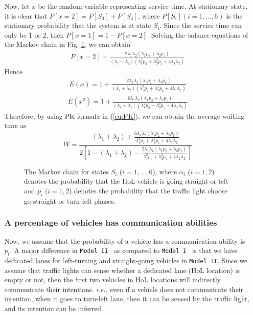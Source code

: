 \documentclass[conference]{IEEEtran}
\newcommand{\ie}{{\em i.e., }}
\newcommand{\modelI}{{\tt{Model I}}}
\newcommand{\modelII}{{\tt{Model II}}}
\begin{document}
Now, let $x$ be the random variable representing service time. At stationary state, it is clear that $P[x=2]=P[S_3]+P[S_4]$, where $P[S_i](i=1,\ldots,6)$ is the stationary probability that the system is at state $S_i$. Since the service time can only be 1 or 2, then $P[x=1]=1-P[x=2]$. Solving the balance equations of the Markov chain in Fig. \ref{fig:markov}, we can obtain
\begin{eqnarray}
P[x=2] = \frac{2\lambda_1\lambda_2(\lambda_1p_2+\lambda_2p_1)}{(\lambda_1+\lambda_2)(\lambda_1^2p_2+\lambda_2^2p_1+4\lambda_1\lambda_2)}
\end{eqnarray}
Hence
\begin{eqnarray}
E(x) = 1+\frac{2\lambda_1\lambda_2(\lambda_1p_2+\lambda_2p_1)}{(\lambda_1+\lambda_2)(\lambda_1^2p_2+\lambda_2^2p_1+4\lambda_1\lambda_2)}
\end{eqnarray}
\begin{eqnarray}
E(x^2) =  1+\frac{6\lambda_1\lambda_2(\lambda_1p_2+\lambda_2p_1)}{(\lambda_1+\lambda_2)(\lambda_1^2p_2+\lambda_2^2p_1+4\lambda_1\lambda_2)}
\end{eqnarray}
Therefore, by using PK formula in (\ref{eq:PK}), we can obtain the average waiting time as
\begin{equation} \label{waitingtime_model2_noonetells}
W=\frac{(\lambda_1+\lambda_2)+\frac{6\lambda_1\lambda_2(\lambda_1p_2+\lambda_2p_1)}{\lambda_1^2p_2+\lambda_2^2p_1+4\lambda_1\lambda_2}}{2\left[1-(\lambda_1+\lambda_2)-\frac{2\lambda_1\lambda_2(\lambda_1p_2+\lambda_2p_1)}{\lambda_1^2p_2+\lambda_2^2p_1+4\lambda_1\lambda_2}\right]}
\end{equation}


\begin{figure} [t!]
\vspace{-15pt}
\centering
{}
\caption{\label{fig:markov} The Markov chain for states $S_i$ ($i=1,\ldots,6$), where $\alpha_i$ ($i=1,2$) denotes the probability that the HoL vehicle is going straight or left and $p_i$ ($i=1,2$) denotes the probability that the traffic light choose go-straight or turn-left phases.}
\vspace{-20pt}
\end{figure}

\subsubsection{A percentage of vehicles has communication abilities}\label{somecarcantellmodel2}
Now, we assume that the probability of a vehicle has a communication ability is $p_t$. A major difference in \modelII~ as compared to \modelI~ is that we have dedicated lanes for left-turning and straight-going vehicles in \modelII. Since we assume that  traffic lights can sense whether a dedicated lane (HoL location) is empty or not, then the first two vehicles in  HoL locations will indirectly communicate their intentions. \ie even if a vehicle does not communicate their intention, when it goes to turn-left lane, then it can be sensed by the traffic light, and its intention can be inferred.
\end{document}

